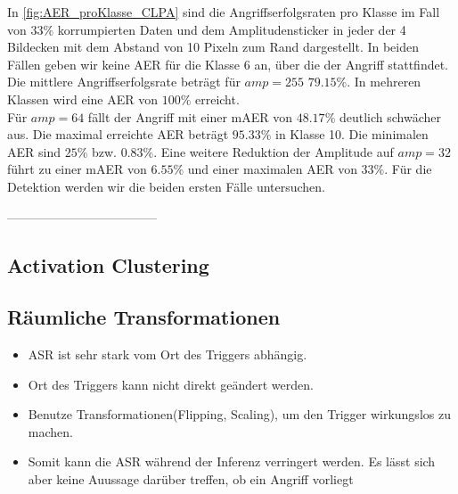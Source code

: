 \documentclass[twoside, 11pt,a4paper]{article}
\numberwithin{equation}{section}
\begin{document}
	In \autoref{fig:AER_proKlasse_CLPA} sind die Angriffserfolgsraten pro Klasse im Fall von $33 \%$ korrumpierten Daten und dem Amplitudensticker in jeder der 4 Bildecken mit dem Abstand von 10 Pixeln zum Rand dargestellt. In beiden Fällen geben wir keine AER für die Klasse 6 an, über die der Angriff stattfindet.
	Die mittlere Angriffserfolgsrate beträgt für $amp=255$ $79.15 \%$. In mehreren Klassen wird eine AER von $100 \%$ erreicht.\\
	Für $amp=64$ fällt der Angriff mit einer mAER von $48.17 \%$ deutlich schwächer aus. Die maximal erreichte AER beträgt $95.33 \%$ in Klasse 10. Die minimalen AER sind $25 \%$ bzw. $0.83 \% $.
	Eine weitere Reduktion der Amplitude auf $amp=32$ führt zu einer mAER von $6.55 \%$ und einer maximalen AER von $33 \%$.
	Für die Detektion werden wir die beiden ersten Fälle untersuchen.
	
	------------------------------------
	\subsection{Activation Clustering}
	\subsection{Räumliche Transformationen}
	\begin{itemize}
		\item ASR ist sehr stark vom Ort des Triggers abhängig.
		\item Ort des Triggers kann nicht direkt geändert werden.
		\item Benutze Transformationen(Flipping, Scaling), um den Trigger wirkungslos zu machen.
		\item Somit kann die ASR während der Inferenz verringert werden. Es lässt sich aber keine Auussage darüber treffen, ob ein Angriff vorliegt
	\end{itemize}
	\newpage
\end{document}
